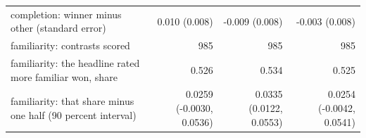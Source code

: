 \begin{tabular}{p{7.6cm}rrr}
completion: winner minus other (standard error) & 0.010 (0.008) & -0.009 (0.008) & -0.003 (0.008) \\
familiarity: contrasts scored & 985 & 985 & 985 \\
familiarity: the headline rated more familiar won, share & 0.526 & 0.534 & 0.525 \\
familiarity: that share minus one half (90 percent interval) & 0.0259 (-0.0030, 0.0536) & 0.0335 (0.0122, 0.0553) & 0.0254 (-0.0042, 0.0541) \\

\end{tabular}
